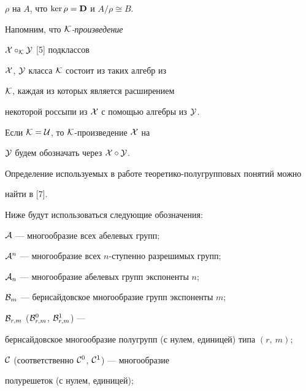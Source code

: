 $\rho$ на $A$, что $\ker\rho={\bold D}$ и $A/\rho \cong B$.





Напомним, что {\it ${\cal K}$-произведение}


${\cal X}\circ_{\cal K} {\cal Y}$ [5] подклассов


${\cal X}$, ${\cal Y}$ класса ${\cal K}$ состоит из таких алгебр из


${\cal K}$, каждая из которых является расширением


некоторой россыпи из ${\cal X}$ с помощью алгебры из $\cal Y$.


Если ${\cal K}={\cal U}$, то ${\cal K}$-произведение ${\cal X}$ на


${\cal Y}$ будем обозначать через ${\cal X}\circ {\cal Y}$.





Определение используемых в работе теоретико-полугрупповых понятий можно 


найти в [7].





Ниже будут использоваться следующие обозначения: 





${\cal A}$ --- многообразие всех абелевых групп;





${\cal A}^n$ --- многообразие всех $n$-ступенно разрешимых групп;





${\cal A}_n$ --- многообразие абелевых групп экспоненты $n$;





${\cal B}_m$ --- бернсайдовское многообразие групп экспоненты $m$;





${\cal B}_{r,m}$ (${\cal B}_{r,m}^0$, ${\cal B}_{r,m}^1$) ---


бернсайдовское многообразие полугрупп (с нулем, единицей) типа $(r,\ m)$; 





${\cal C}$ (соответственно ${\cal C}^0$, ${\cal C}^1$) --- многообразие 


полурешеток (с нулем, единицей); 





